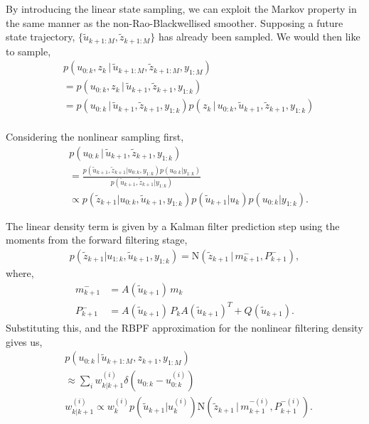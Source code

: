 \documentclass[twocolumn]{autart}    %
\begin{document}
By introducing the linear state sampling, we can exploit the Markov property in the same manner as the non-Rao-Blackwellised smoother. Supposing a future state trajectory, $\{ \tilde{u}_{k+1:M}, \tilde{z}_{k+1:M} \}$ has already been sampled. We would then like to sample,
%
\begin{equation}
\begin{split}
  &p(u_{0:k}, z_k\,|\,\tilde{u}_{k+1:M}, \tilde{z}_{k+1:M},y_{1:M}) \\
  &= p(u_{0:k}, z_k\,|\,\tilde{u}_{k+1}, \tilde{z}_{k+1},y_{1:k}) \\
  &= p(u_{0:k}\,|\,\tilde{u}_{k+1},\tilde{z}_{k+1},y_{1:k}) p(z_k\,|\, u_{0:k}, \tilde{u}_{k+1}, \tilde{z}_{k+1},y_{1:k}) \\
\end{split}
\label{eq:linsampfact}
\end{equation}

Considering the nonlinear sampling first,
%
\begin{equation}
\begin{split}
  &p(u_{0:k}\,|\,\tilde{u}_{k+1},\tilde{z}_{k+1},y_{1:k}) \\
  &= \frac{ p(\tilde{u}_{k+1}, \tilde{z}_{k+1} | u_{0:k}, y_{1:k}) p(u_{0:k}|y_{1:k}) }{ p(\tilde{u}_{k+1}, \tilde{z}_{k+1} | y_{1:k}) } \\
  &\propto p(\tilde{z}_{k+1} | u_{0:k}, \tilde{u}_{k+1}, y_{1:k}) p(\tilde{u}_{k+1} | u_k) p(u_{0:k}|y_{1:k})     .
\end{split}
\end{equation}

The linear density term is given by a Kalman filter prediction step using the moments from the forward filtering stage,
%
\begin{equation}
\begin{split}
  p(\tilde{z}_{k+1} | u_{1:k}, \tilde{u}_{k+1}, y_{1:k}) = \mathrm{N}(\tilde{z}_{k+1}\,|\, m^{-}_{k+1}, P^{-}_{k+1}), 
\end{split}
\end{equation}
%
where,
%
\begin{equation}
\begin{split}
 m^{-}_{k+1} &= A(\tilde{u}_{k+1}) \, m_{k} \\
 P^{-}_{k+1} &= A(\tilde{u}_{k+1}) \, P_{k} A(\tilde{u}_{k+1})^T + Q(\tilde{u}_{k+1})     .
\end{split}
\end{equation}
%
Substituting this, and the RBPF approximation for the nonlinear filtering density gives us,
%
\begin{equation}
\begin{split}
  &p(u_{0:k}\,|\,\tilde{u}_{k+1:M},z_{k+1},y_{1:M}) \\
  &\approx \sum_i w^{(i)}_{k|k+1} \delta(u_{0:k} - u_{0:k}^{(i)}) \\
  &w^{(i)}_{k|k+1} \propto w_k^{(i)} p(\tilde{u}_{k+1} | u_k^{(i)}) \mathrm{N}(\tilde{z}_{k+1}\,|\, m^{-(i)}_{k+1}, P^{-(i)}_{k+1})     .
\end{split}
\end{equation}
\end{document}
